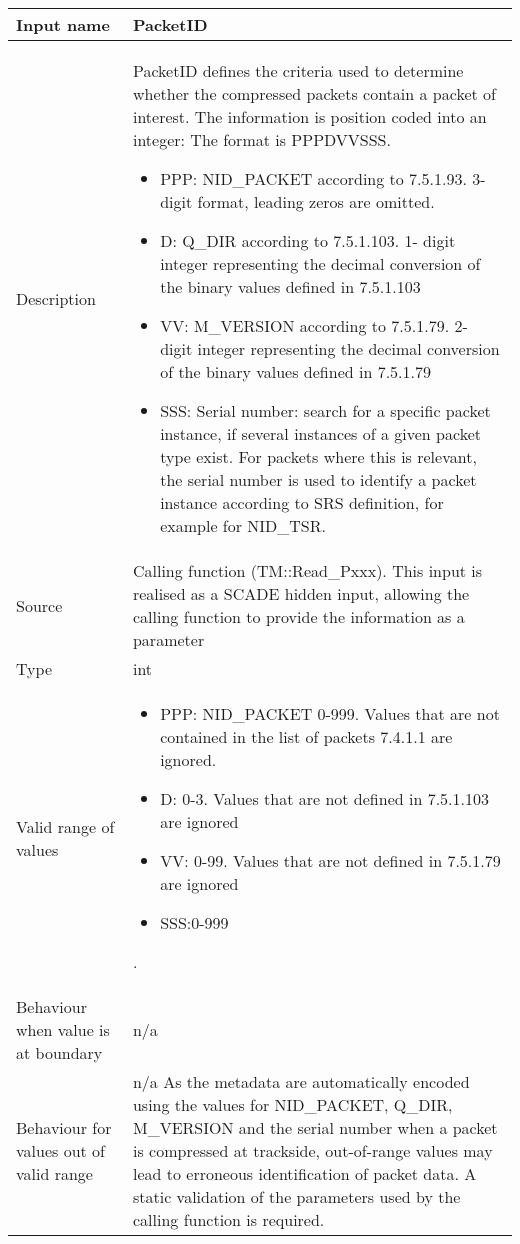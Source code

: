\begin{longtable}{p{}p{}}
\toprule
Input name				&PacketID \\
\midrule
Description				& PacketID defines the criteria used to determine whether the compressed packets contain a packet of interest. \newline
The information is position coded into an integer:\newline
The format is PPPDVVSSS.
\begin{itemize}
\item PPP: NID\_PACKET according to 7.5.1.93. 3-digit format, leading zeros are omitted.
\item D: Q\_DIR according to 7.5.1.103. 1- digit integer representing the decimal conversion of the binary values defined in 7.5.1.103
\item VV: M\_VERSION according to 7.5.1.79. 2- digit integer representing the decimal conversion of the binary values defined in 7.5.1.79
\item SSS: Serial number: search for a specific packet instance, if several instances of a given packet type exist. For packets where this is relevant, the serial number is used to identify a packet instance according to SRS definition, for example for NID\_TSR.
\end{itemize}

  \\
\midrule
Source					& Calling function  (TM::Read\_Pxxx). This input is realised as a SCADE hidden input, allowing the calling function to provide the information as a parameter \\ 
\midrule
Type					& int \\
\midrule
Valid range of values 	& 
\begin{itemize}
\item PPP: NID\_PACKET 0-999. Values that are not contained in the list of packets 7.4.1.1 are ignored.
\item D: 0-3. Values that are not defined in 7.5.1.103 are ignored
\item VV: 0-99. Values that are not defined in 7.5.1.79 are ignored
\item SSS:0-999
\end{itemize}
.\newline

 \\
\midrule
Behaviour when value is at boundary	& n/a \\
\midrule
Behaviour for values out of valid range	& n/a \newline \newline
As the metadata are automatically encoded using the values for NID\_PACKET, Q\_DIR, M\_VERSION and the serial number when a packet is compressed at trackside, out-of-range values may lead to erroneous identification of packet data. \newline
A static validation of the parameters used by the calling function is required. 
 \\
\bottomrule
\end{longtable}

